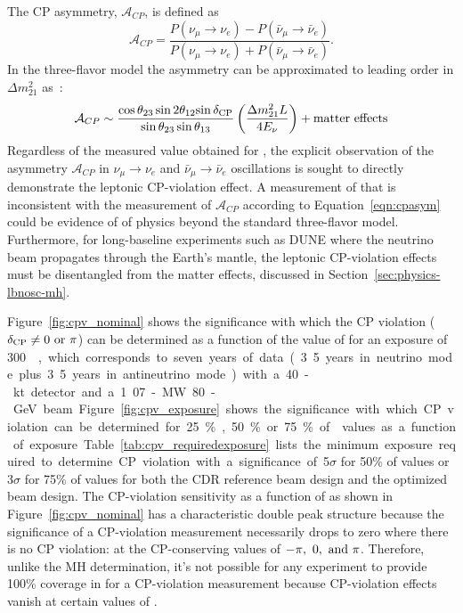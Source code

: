 The CP asymmetry,
$\mathcal{A}_{CP}$, is defined as 
\begin{equation}
\label{eqn:cp-asymm}
 \mathcal{A}_{CP} = \frac{P(\nu_\mu \rightarrow \nu_e) -
  P(\bar{\nu}_\mu \rightarrow \bar{\nu}_e)}{P(\nu_\mu \rightarrow
  \nu_e) + P(\bar{\nu}_\mu \rightarrow \bar{\nu}_e)}.
\end{equation}
In the three-flavor model the asymmetry can be approximated to leading
order in $\Delta m_{21}^2$ as~\cite{Marciano:2006uc}:
\begin{equation}
\mathcal{A}_{CP} \sim \frac{\cos \theta_{23} \sin 2 \theta_{12}
  {\sin \mdeltacp}}{\sin \theta_{23} \sin \theta_{13}}
\left(\frac{\Delta m^2_{21} L}{ 4 E_{\nu}}\right) + {\rm matter
  \ effects}
\label{eqn:cpasym}
\end{equation}
Regardless of the measured value obtained for \deltacp, the explicit
observation of the asymmetry $\mathcal{A}_{CP}$ in $\nu_{\mu}
\rightarrow \nu_e$ and $\bar{\nu}_{\mu} \rightarrow
\bar{\nu}_e$ oscillations is sought to directly demonstrate the
leptonic CP-violation effect.  A measurement of \deltacp that is
inconsistent with the measurement of $\mathcal{A}_{CP}$ according to
Equation~\ref{eqn:cpasym} could be evidence of of physics beyond the
standard three-flavor model.  Furthermore, for long-baseline
experiments such as DUNE where the neutrino beam propagates through
the Earth's mantle, the leptonic CP-violation effects must be
disentangled from the matter effects, discussed in
Section~\ref{sec:physics-lbnosc-mh}.

Figure~\ref{fig:cpv_nominal} shows the significance with which the CP
violation ($\mdeltacp \neq 0 \ {\rm or} \ \pi$) can be determined as a
function of the value of \deltacp for an exposure of \SI{300}~\ktMWyr,
which corresponds to seven years of data (3.5 years in neutrino mode
plus 3.5 years in antineutrino mode) with a 40-kt detector and a
1.07-MW 80-GeV beam.  Figure~\ref{fig:cpv_exposure} shows the significance
with which CP violation can be determined for 25\%, 50\% or 75\% of \deltacp
values as a function of exposure.
Table~\ref{tab:cpv_requiredexposure} lists the minimum exposure
required to determine CP violation with a significance of 5$\sigma$
for 50\% of \deltacp values or 3$\sigma$ for 75\% of \deltacp values
for both the CDR reference beam design and the optimized beam design.
The CP-violation sensitivity as a function of \deltacp as shown in
Figure~\ref{fig:cpv_nominal} has a characteristic double peak
structure because the significance of a CP-violation measurement
necessarily drops to zero where there is no CP violation: at the
CP-conserving values of $-\pi,~0,~{\rm and}~\pi$.  Therefore, unlike
the MH determination, it's not possible for any experiment to provide
100\% coverage in \deltacp for a CP-violation measurement because CP-violation effects vanish at certain values of \deltacp.

